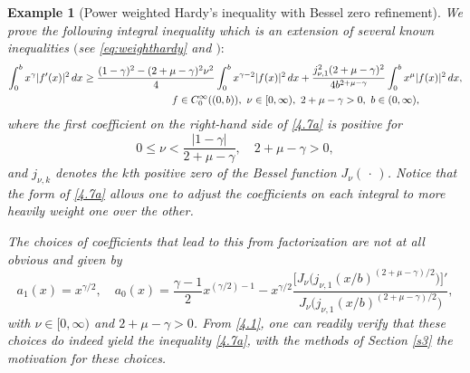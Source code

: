 \documentclass[reqno,10pt,centertags]{amsart}
\newcommand{\g}{\gamma}
\newcommand{\dott}{\,\cdot\,}
\numberwithin{equation}{section}
\newtheorem{example}[theorem]{Example}
\theoremstyle{remark}
\begin{document}
\begin{example}[Power weighted Hardy's inequality with Bessel zero refinement]\label{ex4.1a} 
We prove the following integral inequality which is an extension of several known inequalities $($see \eqref{eq:weighthardy} and \cite[Eq. (3.48)]{GPS21}$)$$:$ 
\begin{align}\label{4.7a}
\int_0^b x^\g |f'(x)|^2\, dx & \geq \frac{(1-\g)^2-(2+\mu-\g)^2\nu^2}{4}\int_0^b x^{\g-2}|f(x)|^2\, dx +\frac{j_{\nu,1}^2(2+\mu-\g)^2}{4b^{2+\mu-\g}}\int_0^b x^\mu |f(x)|^2\, dx,\notag\\
&\hspace{3cm} f\in C_0^\infty((0,b)),\ \nu\in[0,\infty),\ 2+\mu-\g>0,\ b\in(0,\infty),
\end{align}
where the first coefficient on the right-hand side of \eqref{4.7a} is positive for
\begin{equation}
0\leq\nu< \frac{|1-\g|}{2+\mu-\g},\quad 2+\mu-\g>0,
\end{equation}
and $j_{\nu,k}$ denotes the $k$th positive zero of the Bessel function $J_\nu(\dott)$. Notice that the form of \eqref{4.7a} allows one to adjust the coefficients on each integral to more heavily weight one over the other.

The choices of coefficients that lead to this from factorization are not at all obvious and given by
\begin{equation}\label{4.9a}
a_1(x)=x^{\g/2},\quad a_0(x)=\frac{\g-1}{2}x^{(\g/2)-1}-x^{\g/2}\frac{\big[J_\nu\big(j_{\nu,1}(x/b)^{(2+\mu-\g)/2}\big)\big]'}{J_\nu\big(j_{\nu,1}(x/b)^{(2+\mu-\g)/2}\big)},
\end{equation}
with $\nu\in[0,\infty)$ and $2+\mu-\g>0$. From \eqref{4.1}, one can readily verify that these choices do indeed yield the inequality \eqref{4.7a}, with the methods of Section \ref{s3} the motivation for these choices.


\end{example}
\end{document}
